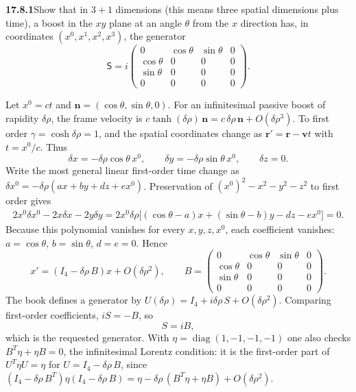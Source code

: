 \par\bigskip
\noindent\textbf{17.8.1}\quad Show that in $3+1$ dimensions (this
means three spatial dimensions plus time), a boost in the $xy$ plane
at an angle $\theta$ from the $x$ direction has, in coordinates
$(x^{0},x^{1},x^{2},x^{3})$, the generator
\[
\mathsf{S}=i\begin{pmatrix}
0 & \cos\theta & \sin\theta & 0\\
\cos\theta & 0 & 0 & 0\\
\sin\theta & 0 & 0 & 0\\
0 & 0 & 0 & 0
\end{pmatrix}.
\]
\par{}
\solution
Let $x^0=ct$ and
$\mathbf n=(\cos\theta,\sin\theta,0)$.
For an infinitesimal passive boost of rapidity $\delta\rho$,
the frame velocity is
$c\tanh(\delta\rho)\,\mathbf n=c\,\delta\rho\,\mathbf n+O(\delta\rho^3)$.
To first order $\gamma=\cosh\delta\rho=1$, and the spatial coordinates
change as $\mathbf r'=\mathbf r-\mathbf vt$ with $t=x^0/c$.
Thus
\[
\delta x=-\delta\rho\cos\theta\,x^0,\qquad
\delta y=-\delta\rho\sin\theta\,x^0,\qquad \delta z=0.
\]
Write the most general linear first-order time change as
$\delta x^0=-\delta\rho(ax+by+dz+ex^0)$.
Preservation of $(x^0)^2-x^2-y^2-z^2$ to first order gives
\[
\begin{aligned}
2x^0\delta x^0-2x\delta x-2y\delta y
=2x^0\delta\rho\big[
(\cos\theta-a)x+(\sin\theta-b)y-dz-ex^0\big]=0.
\end{aligned}
\]
Because this polynomial vanishes for every $x,y,z,x^0$, each
coefficient vanishes:
$a=\cos\theta$, $b=\sin\theta$, $d=e=0$. Hence
\[
x'=(I_4-\delta\rho\,B)x+O(\delta\rho^2),\qquad
B=\begin{pmatrix}
0&\cos\theta&\sin\theta&0\\
\cos\theta&0&0&0\\
\sin\theta&0&0&0\\
0&0&0&0
\end{pmatrix}.
\]
The book defines a generator by
$U(\delta\rho)=I_4+i\delta\rho\,S+O(\delta\rho^2)$.
Comparing first-order coefficients, $iS=-B$, so
\[
\boxed{S=iB},
\]
which is the requested generator. With
$\eta=\operatorname{diag}(1,-1,-1,-1)$ one also checks
$B^T\eta+\eta B=0$, the infinitesimal Lorentz condition: it is the
first-order part of $U^T\eta U=\eta$ for $U=I_4-\delta\rho\,B$, since
$(I_4-\delta\rho\,B^T)\eta(I_4-\delta\rho\,B)
=\eta-\delta\rho\,(B^T\eta+\eta B)+O(\delta\rho^2)$.

